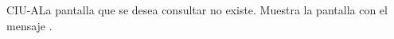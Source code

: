 	
	\begin{UCtrayectoriaA}{CIU-A}{La pantalla que se desea consultar no existe.}
		\UCpaso[\UCsist] Muestra la pantalla  con el mensaje .
	\end{UCtrayectoriaA}


	

